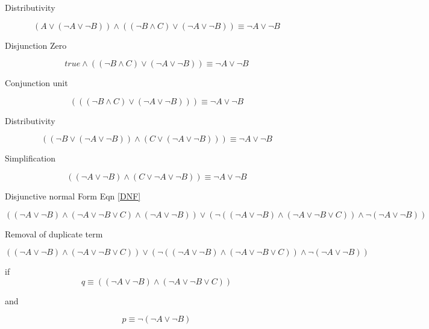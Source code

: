 \documentclass[10pt,a4paper]{article}
\begin{document}
Distributivity

\begin{equation}
(A \vee (\neg A \vee\neg B))\wedge((\neg B \wedge C) \vee (\neg A \vee \neg B)) \equiv \neg A \vee \neg B
\end{equation}

Disjunction Zero

\begin{equation}
true \wedge((\neg B \wedge C) \vee (\neg A \vee \neg B)) \equiv \neg A \vee \neg B
\end{equation}

Conjunction unit

\begin{equation}
(((\neg B \wedge C) \vee (\neg A \vee \neg B))) \equiv \neg A \vee \neg B
\end{equation}

Distributivity

\begin{equation}
((\neg B \vee (\neg A \vee \neg B ))\wedge(C \vee (\neg A \vee \neg B))) \equiv \neg A \vee \neg B
\end{equation}

Simplification

\begin{equation}
((\neg A \vee \neg B )\wedge(C \vee \neg A \vee \neg B)) \equiv \neg A \vee \neg B
\end{equation}

Disjunctive normal Form Eqn \ref{DNF}

\begin{equation}
 ((\neg A \vee \neg B) \wedge(\neg A\vee\neg B\vee C) \wedge(\neg A\vee\neg B)) \vee (\neg ((\neg A\vee \neg B)\wedge(\neg A\vee\neg B\vee C))\wedge\neg(\neg A\vee \neg B))
\end{equation}

Removal of duplicate term

\begin{equation}
 ((\neg A \vee \neg B) \wedge(\neg A\vee\neg B\vee C)) \vee (\neg ((\neg A\vee \neg B)\wedge(\neg A\vee\neg B\vee C))\wedge\neg(\neg A\vee \neg B))
 \label{replace22}
\end{equation}

if 
\begin{equation}
 q \equiv ((\neg A \vee \neg B) \wedge(\neg A\vee\neg B\vee C)) 
\end{equation}

and 

\begin{equation}
 p \equiv \neg(\neg A\vee \neg B)
\end{equation}
\end{document}

